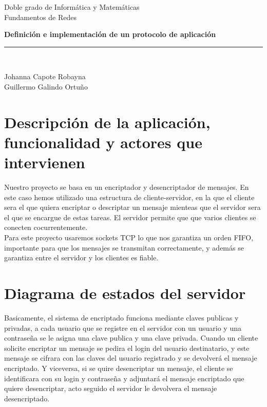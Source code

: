 \documentclass[11pt]{article}
\begin{document}
\begin{titlepage}

\begin{center}
Doble grado de Inform\'atica y Matem\'aticas\\
\vspace*{0.15in}
Fundamentos de Redes \\
\vspace*{2in}
\vspace*{0.2in}
\begin{LARGE}
\textbf{Definici\'on e implementación de un protocolo de aplicaci\'on} \\
\end{LARGE}
\rule{80mm}{0.1mm}\\
\vspace*{0.1in}
\begin{large}
Johanna Capote Robayna\\
Guillermo Galindo Ortuño \\
\end{large}
\end{center}

\end{titlepage}
\newpage
\section{Descripci\'on de la aplicaci\'on, funcionalidad y actores que intervienen}
Nuestro proyecto se basa en un encriptador y desencriptador de mensajes. En este caso hemos utilizado una estructura de cliente-servidor, en la que el cliente sera el que quiera encriptar o descriptar un mensaje mienteas que el servidor sera el que se encargue de estas tareas. El servidor permite que que varios clientes se conecten cocurrentemente.\\
Para este proyecto usaremos sockets TCP lo que nos garantiza un orden FIFO, importante para que los mensajes se transmitan correctamente, y adem\'as se garantiza entre el servidor y los clientes es fiable.
\newpage
\section{Diagrama de estados del servidor}
Basicamente, el sistema de encriptado funciona mediante claves publicas y privadas, a cada usuario que se registre en el servidor con un usuario y una contraseña se le asigna una clave publica y una clave privada. Cuando un cliente solicite encriptar un mensaje se pedira el login del usuario destinatario, y este mensaje se cifrara con las claves del usuario registrado y se devolver\'a el mensaje encriptado. Y viceversa, si se quire desencriptar un mensaje, el cliente se identificara con su login y contraseña y adjuntar\'a el mensaje encriptado que quiere desencriptar, acto seguido el servidor le devolvera el mensaje desencriptado.
\end{document}
